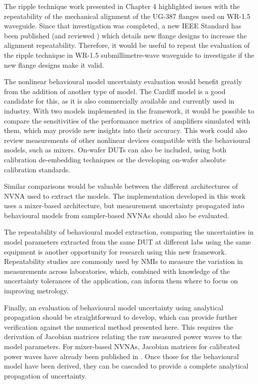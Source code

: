 \documentclass[../thesis/thesis.tex]{subfiles}
\begin{document}
\begin{refsection}
The ripple technique work presented in Chapter 4 highlighted issues with the repeatability of the mechanical alignment of the UG-387 flanges used on WR-1.5 waveguide. Since that investigation was completed, a new IEEE Standard has been published (and reviewed \cite{Ridler_2017}) which details new flange designs to increase the alignment repeatability. Therefore, it would be useful to repeat the evaluation of the ripple technique in WR-1.5 submillimetre-wave waveguide to investigate if the new flange designs make it valid.

The nonlinear behavioural model uncertainty evaluation would benefit greatly from the addition of another type of model. The Cardiff model is a good candidate for this, as it is also commercially available and currently used in industry. With two models implemented in the framework, it would be possible to compare the sensitivities of the performance metrics of amplifiers simulated with them, which may provide new insights into their accuracy. This work could also review measurements of other nonlinear devices compatible with the behavioural models, such as mixers. On-wafer DUTs can also be included, using both calibration de-embedding techniques or the developing on-wafer absolute calibration standards.

Similar comparisons would be valuable between the different architectures of NVNA used to extract the models. The implementation developed in this work uses a mixer-based architecture, but measurement uncertainty propagated into behavioural models from sampler-based NVNAs should also be evaluated.

The repeatability of behavioural model extraction, comparing the uncertainties in model parameters extracted from the same DUT at different labs using the same equipment is another opportunity for research using this new framework. Repeatability studies are commonly used by NMIs to measure the variation in measurements across laboratories, which, combined with knowledge of the uncertainty tolerances of the application, can inform them where to focus on improving metrology.

Finally, an evaluation of behavioural model uncertainty using analytical propagation should be straightforward to develop, which can provide further verification against the numerical method presented here. This requires the derivation of Jacobian matrices relating the raw measured power waves to the model parameters. For mixer-based NVNAs, Jacobian matrices for calibrated power waves have already been published in \cite{Lin_2012}. Once those for the behavioural model have been derived, they can be cascaded to provide a complete analytical propagation of uncertainty.

\end{refsection}
\end{document}
